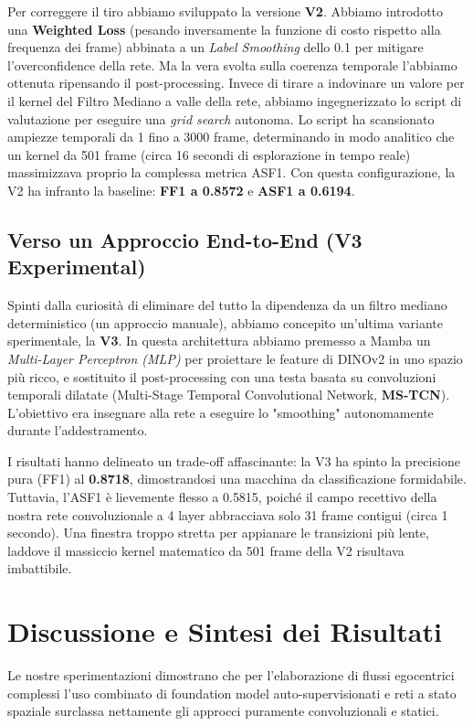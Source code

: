 \documentclass[a4paper,12pt]{report}
\begin{document}
Per correggere il tiro abbiamo sviluppato la versione \textbf{V2}. Abbiamo introdotto una \textbf{Weighted Loss} (pesando inversamente la funzione di costo rispetto alla frequenza dei frame) abbinata a un \emph{Label Smoothing} dello 0.1 per mitigare l'overconfidence della rete. 
Ma la vera svolta sulla coerenza temporale l'abbiamo ottenuta ripensando il post-processing. Invece di tirare a indovinare un valore per il kernel del Filtro Mediano a valle della rete, abbiamo ingegnerizzato lo script di valutazione per eseguire una \emph{grid search} autonoma. Lo script ha scansionato ampiezze temporali da 1 fino a 3000 frame, determinando in modo analitico che un kernel da 501 frame (circa 16 secondi di esplorazione in tempo reale) massimizzava proprio la complessa metrica ASF1.
Con questa configurazione, la V2 ha infranto la baseline: \textbf{FF1 a 0.8572} e \textbf{ASF1 a 0.6194}.

\subsection{Verso un Approccio End-to-End (V3 Experimental)}
Spinti dalla curiosità di eliminare del tutto la dipendenza da un filtro mediano deterministico (un approccio manuale), abbiamo concepito un'ultima variante sperimentale, la \textbf{V3}. 
In questa architettura abbiamo premesso a Mamba un \emph{Multi-Layer Perceptron (MLP)} per proiettare le feature di DINOv2 in uno spazio più ricco, e sostituito il post-processing con una testa basata su convoluzioni temporali dilatate (Multi-Stage Temporal Convolutional Network, \textbf{MS-TCN}). L'obiettivo era insegnare alla rete a eseguire lo "smoothing" autonomamente durante l'addestramento.

I risultati hanno delineato un trade-off affascinante: la V3 ha spinto la precisione pura (FF1) al \textbf{0.8718}, dimostrandosi una macchina da classificazione formidabile. Tuttavia, l'ASF1 è lievemente flesso a 0.5815, poiché il campo recettivo della nostra rete convoluzionale a 4 layer abbracciava solo 31 frame contigui (circa 1 secondo). Una finestra troppo stretta per appianare le transizioni più lente, laddove il massiccio kernel matematico da 501 frame della V2 risultava imbattibile.

\section{Discussione e Sintesi dei Risultati}
Le nostre sperimentazioni dimostrano che per l'elaborazione di flussi egocentrici complessi l'uso combinato di foundation model auto-supervisionati e reti a stato spaziale surclassa nettamente gli approcci puramente convoluzionali e statici.
\end{document}
